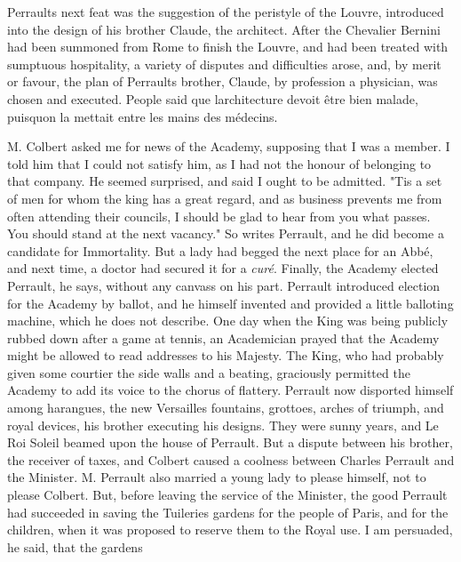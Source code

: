 \documentclass[14pt,a4paper]{memoir}
\begin{document}
Perrault\textquotesingle s next feat was the suggestion of the peristyle
of the Louvre, introduced into the design of his brother Claude, the
architect. After the Chevalier Bernini had been summoned from Rome to
finish the Louvre, and had been treated with sumptuous hospitality, a
variety of disputes and difficulties arose, and, by merit or favour, the
plan of Perrault\textquotesingle s brother, Claude, by profession a
physician, was chosen and executed. People said \textquotesingle que
l\textquotesingle architecture devoit être bien malade,
puisqu\textquotesingle on la mettait entre les mains des
médecins.\textquotesingle{}

\textquotesingle M. Colbert asked me for news of the Academy, supposing
that I was a member. I told him that I could not satisfy him, as I had
not the honour of belonging to that company. He seemed surprised, and
said I ought to be admitted. "\textquotesingle Tis a set of men for whom
the king has a great regard, and as business prevents me from often
attending their councils, I should be glad to hear from you what passes.
You should stand at the next vacancy."\textquotesingle{} So writes
Perrault, and he did become a candidate for Immortality. But a lady had
begged the next place for an Abbé, and next time, a doctor had secured
it for a \emph{curé}. Finally, the Academy elected Perrault, he says,
without any canvass on his part. Perrault introduced election for the
Academy by ballot, and he himself invented and provided a little
balloting machine, which he does not describe. One day when the King was
being publicly rubbed down after a game at tennis, an Academician prayed
that the Academy might be allowed to read addresses to his Majesty. The
King, who had probably given some courtier the side walls and a beating,
graciously permitted the Academy to add its voice to the chorus of
flattery. Perrault now disported himself among harangues, the new
Versailles fountains, grottoes, arches of triumph, and royal devices,
his brother executing his designs. They were sunny years, and Le Roi
Soleil beamed upon the house of Perrault. But a dispute between his
brother, the receiver of taxes, and Colbert caused a coolness between
Charles Perrault and the Minister. M. Perrault also married a young lady
to please himself, not to please Colbert. But, before leaving the
service of the Minister, the good Perrault had succeeded in saving the
Tuileries gardens for the people of Paris, and for the children, when it
was proposed to reserve them to the Royal use. \textquotesingle I am
persuaded,\textquotesingle{} he said, \textquotesingle that the gardens
\end{document}

